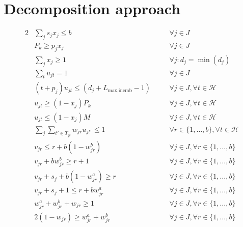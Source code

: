 \documentclass[13pt, letterpaper, twoside]{book}
\begin{document}

\section{Decomposition approach}

\begin{alignat}{2}
& \label{dc:eq1} \sum_j s_j x_j \leq b \quad && \forall j \in J \\
& P_k \geq p_j x_j \quad && \forall j \in J \\
& \label{dc:eq3} \sum_j x_j \geq 1 \quad && \forall j : d_j = \min(d_j) \\[2ex]
& \label{dc:eq4} \sum_t u_{jt} = 1 \quad && \forall j \in J \\
& (t + p_j) u_{jt}  \leq (d_j + L_{\text{max,incmb}} - 1) \quad &&
\forall j \in J, \forall t \in \mathcal{H} \\
& u_{jt} \geq (1-x_j) P_k \quad && \forall j \in J, \forall t \in \mathcal{H} \\
& u_{jt} \leq (1-x_j) M \quad && \forall j \in J, \forall t \in \mathcal{H} \\
& \label{dc:eq8} \sum_j \sum_{t' \in T_{jt}} w_{jr} u_{jt'} \leq 1 \quad && \forall r
\in \{1, \dots, b\}, \forall t \in \mathcal{H} \\[2ex]
& \label{dc:eq9} v_{jr} \leq r + b(1 - w^b_{jr}) \quad && \forall j \in J, \forall r \in
\{1,\dots, b\} \\
& v_{jr} + b w^b_{jr} \geq r + 1 \quad && \forall j \in J, \forall r \in \{1,\dots,b\}
\\
& v_{jr} + s_j + b(1 - w^a_{jr}) \geq r \quad && \forall j \in J, \forall r \in
\{1, \dots, b\} \\
& v_{jr} + s_j + 1 \leq r + b w^a_{jr} \quad && \forall j \in J, \forall r \in
\{1,\dots,b\} \\[2ex]
& w^a_{jr} + w^b_{jr} + w_{jr} \geq 1 \quad && \forall j \in J, \forall r \in
\{1,\dots,b\} \\
& \label{dc:eq14} 2(1-w_{jr}) \geq w^a_{jr} + w^b_{jr} \quad && \forall j \in J, \forall r \in \{1,\dots,b\}
\end{alignat}
\end{document}
